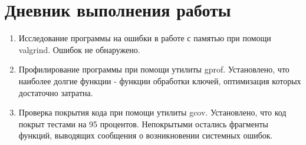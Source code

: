 \section{Дневник выполнения работы}
{\itshape}

\begin{enumerate}
	\item Исследование программы на ошибки в работе с памятью при помощи valgrind. Ошибок не обнаружено.
	
	\item  Профилирование программы при помощи утилиты gprof. Установлено, что наиболее долгие функции - функции обработки 
	ключей, оптимизация которых достаточно затратна.
	
	\item Проверка покрытия кода при помощи утилиты gcov. Установлено, что код покрыт тестами на 95 процентов. Непокрытыми остались 
	фрагменты функций, выводящих сообщения о возникновении системных ошибок.
	
\end{enumerate}

\pagebreak

